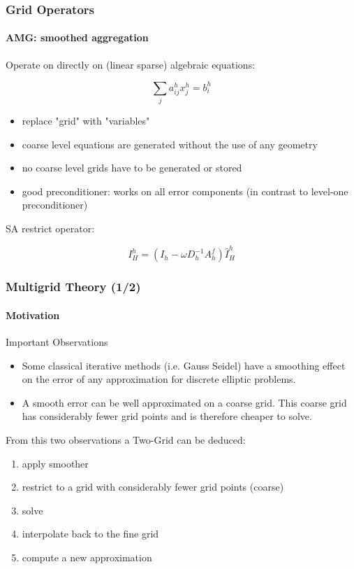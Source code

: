 \documentclass[xcolor=pdftex,table,10pt]{beamer}
\begin{document}
	\begin{frame}
		\frametitle{Grid Operators}
		\framesubtitle{AMG: smoothed aggregation}


		Operate on directly on (linear sparse) algebraic equations:

		\[
			\sum_j a_{ij}^h x_j^h = b_i^h
		\]

		\begin{itemize}
			\item replace "grid" with "variables"
			\item coarse level equations are generated without the use of any geometry
			\item no coarse level grids have to be generated or stored
			\item good preconditioner: works on all error components (in contrast to level-one preconditioner)
		\end{itemize}

		\vspace{0.2cm}
		SA restrict operator:

		\[
			I_H^h = (I_h - \omega D_h^{-1} A_h^f) \hat{I}_H^h
		\]

	
  	\end{frame}

    	\begin{frame}
		\frametitle{Multigrid Theory (1/2)}
		\framesubtitle{Motivation}

		\begin{block}{Important Observations}
			\begin{itemize}
				\item Some classical iterative methods (i.e. Gauss Seidel) have a smoothing effect on the error of any approximation for discrete elliptic problems.
				\vspace{0.2cm}
				\item A smooth error can be well approximated on a coarse grid. This coarse grid has considerably fewer grid points and is therefore cheaper to solve.
			\end{itemize}
		\end{block}

		\vspace{0.4cm}

		From this two observations a Two-Grid can be deduced:

		\begin{enumerate}
			\item apply smoother
			\item restrict to a grid with considerably fewer grid points (coarse)
			\item solve
			\item interpolate back to the fine grid
			\item compute a new approximation
		\end{enumerate}

	\end{frame}
    	
\end{document}

